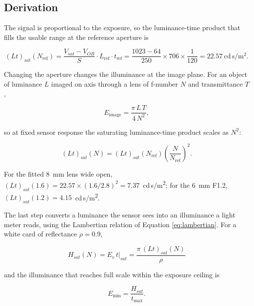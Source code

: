 \subsection{Derivation}

The signal is proportional to the exposure, so the luminance-time product that fills the usable range at the reference aperture is

\begin{equation}
(L t)_{sat}(N_{\mathrm{ref}}) = \frac{V_{sat}-V_{OB}}{S} \cdot L_{\mathrm{ref}} \cdot t_{\mathrm{ref}}
= \frac{1023-64}{250} \times 706 \times \frac{1}{120} = 22.57~\mathrm{cd\,s/m^2} .
\label{eq:ltsat-ref}
\end{equation}

Changing the aperture changes the illuminance at the image plane. For an object of luminance $L$ imaged on axis through a lens of f-number $N$ and transmittance $T$,

\begin{equation}
E_{\mathrm{image}} = \frac{\pi\,L\,T}{4\,N^{2}} ,
\label{eq:image-illuminance}
\end{equation}

so at fixed sensor response the saturating luminance-time product scales as $N^{2}$:

\begin{equation}
(L t)_{sat}(N) = (L t)_{sat}(N_{\mathrm{ref}}) \left(\frac{N}{N_{\mathrm{ref}}}\right)^{2} .
\label{eq:ltsat-n}
\end{equation}

For the fitted 8~mm lens wide open, $(L t)_{sat}(1.6) = 22.57 \times (1.6/2.8)^2 = 7.37$~cd\,s/m\textsuperscript{2}; for the 6~mm F1.2, $(L t)_{sat}(1.2) = 4.15$~cd\,s/m\textsuperscript{2}.

The last step converts a luminance the sensor sees into an illuminance a light meter reads, using the Lambertian relation of Equation \ref{eq:lambertian}. For a white card of reflectance $\rho = 0.9$,

\begin{equation}
\boxed{\;H_{sat}(N) = E_v\,t \big|_{sat} = \frac{\pi\,(L t)_{sat}(N)}{\rho}\;}
\label{eq:hsat}
\end{equation}

and the illuminance that reaches full scale within the exposure ceiling is

\begin{equation}
E_{\min} = \frac{H_{sat}}{t_{\max}} .
\label{eq:emin}
\end{equation}

